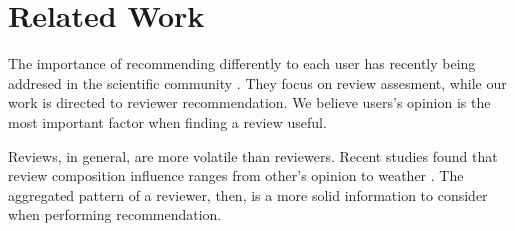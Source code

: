 \section{Related Work}
The importance of recommending differently to each user has recently being
addresed in the scientific community \cite{qualiPred, helpPred}. They focus on
review assesment, while our work is directed to reviewer recommendation. We
believe users's opinion is the most important factor when finding a review
useful.

Reviews, in general, are more volatile than reviewers. Recent studies found that
review composition influence ranges from other's opinion to weather \cite{demog,
wasHelp}. The aggregated pattern of a reviewer, then, is a more solid
information to consider when performing recommendation.
